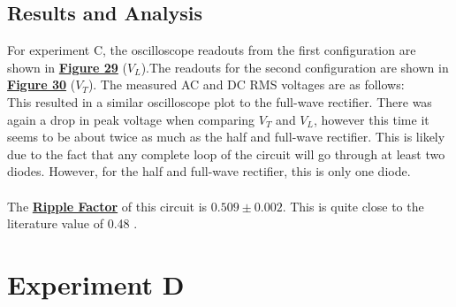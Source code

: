 \documentclass[
	letterpaper
	12pt
]{template}
\newcommand{\bref}[2]{\textbf{\hyperref[#1]{#2}}}
\begin{document}
\subsection{Results and Analysis}
For experiment C, the oscilloscope readouts from the first configuration are shown in \bref{data::C}{Figure 29} ($V_{L}$).The readouts for the second configuration are shown in \bref{data::B2}{Figure 30} ($V_{T}$). The measured AC and DC RMS voltages are as follows:\\


This resulted in a similar oscilloscope plot to the full-wave rectifier. There was again a drop in peak voltage when comparing $V_T$ and $V_L$, however this time it seems to be about twice as much as the half and full-wave rectifier. This is likely due to the fact that any complete loop of the circuit will go through at least two diodes. However, for the half and full-wave rectifier, this is only one diode.\\\\
The \bref{eqn::ripple}{Ripple Factor} of this circuit is $0.509\pm0.002$. This is quite close to the literature value of 0.48 \cite{Rashid_2006}.








\section{Experiment D}\label{exp::D}
\end{document}
